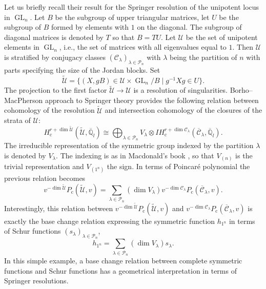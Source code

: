 \documentclass[11pt]{article}
\newcommand{\ie}{i.e.,\xspace}
\newcommand{\rc}{\mathrm{c}}
\theoremstyle{definition}
\theoremstyle{plain}
\DeclareMathOperator{\GL}{GL}
\newcommand{\qlbar}{\overline{\mathbb{Q}}_l}
\newcommand{\IH}{\mathit{IH}}
\newcommand{\Part}{\mathcal{P}}
\newcommand{\inv}{^{-1}}
\begin{document}
Let us briefly recall their result for the Springer resolution of the unipotent locus in $\GL_n$. Let $B$ be the subgroup of upper triangular matrices, let $U$ be the subgroup of $B$ formed by elements with $1$ on the diagonal. The subgroup of diagonal matrices is denoted by $T$ so that $B=T U$. Let $\mathcal{U}$ be the set of unipotent elements in $\GL_n$, \ie the set of matrices with all eigenvalues equal to $1$. Then $\mathcal{U}$ is stratified by conjugacy classes $\left(\mathcal{C}_{\lambda}\right)_{\lambda\in\Part_n}$ with $\lambda$ being the partition of $n$ with parts specifying the size of the Jordan blocks. Set
\[
\widetilde{\mathcal{U}}=\lbrace (X, g B)\in\mathcal{U}\times \GL_n/B \mid g\inv X g \in U \rbrace.
\]
The projection to the first factor $\widetilde{\mathcal{U}}\to\mathcal{U}$ is a resolution of singularities. Borho--MacPherson approach to Springer theory provides the following relation between cohomology of the resolution $\widetilde{\mathcal{U}}$ and intersection cohomology of the closures of the strata of $\mathcal{U}$:
\[
H_\rc^{r+\dim \widetilde{\mathcal{U}}}(\widetilde{\mathcal{U}}, \qlbar) \cong \bigoplus_{\lambda \in \Part_n} V_{\lambda} \otimes \IH_{\rc}^{r+\dim \mathcal{C}_{\lambda}}(\overline{\mathcal{C}}_{\lambda},\qlbar).
\]
The irreducible representation of the symmetric group indexed by the partition $\lambda$ is denoted by $V_{\lambda}$. The indexing is as in Macdonald's book \cite{Macdonald}, so that $V_{(n)}$ is the trivial representation and $V_{(1^n)}$ the sign. In terms of Poincaré polynomial the previous relation becomes
\[
v^{-\dim \widetilde{\mathcal{U}}} P_{\rc}(\widetilde{\mathcal{U}},v) = \sum_{\lambda\in \Part_n}(\dim V_{\lambda}) v^{-\dim \mathcal{C}_{\lambda}} P_{\rc}(\overline{\mathcal{C}}_{\lambda},v).
\]
Interestingly, this relation between $v^{-\dim \widetilde{\mathcal{U}}} P_{\rc}(\widetilde{\mathcal{U}},v)$ and $v^{-\dim \mathcal{C}_{\lambda}}P_{\rc}(\overline{\mathcal{C}}_{\lambda},v)$ is exactly the base change relation expressing the symmetric function $h_{1^n}$ in terms of Schur functions $\left(s_{\lambda}\right)_{\lambda\in\Part_n}$,
\[
h_{1^n} = \sum_{\lambda\in\Part_n} (\dim V_{\lambda}) s_{\lambda}.
\]
In this simple example, a base change relation between complete symmetric functions and Schur functions has a geometrical interpretation in terms of Springer resolutions.
\end{document}
